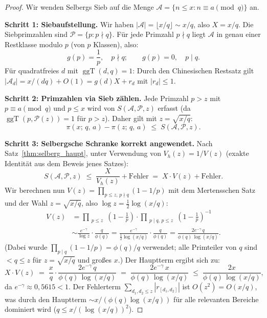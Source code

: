\documentclass[12pt,a4paper]{amsart}
\theoremstyle{definition}
\DeclareMathOperator{\ggT}{ggT}
\begin{document}
\begin{proof}
  Wir wenden Selbergs Sieb auf die Menge
  $\mathcal{A} = \{n \leq x : n \equiv a \pmod q\}$ an.

  \textbf{Schritt 1: Siebaufstellung.}
  Wir haben $|\mathcal{A}| = \lfloor x/q \rfloor \sim x/q$, also $X = x/q$.
  Die Siebprimzahlen sind $\mathcal{P} = \{p : p \nmid q\}$.
  Für jede Primzahl $p \nmid q$ liegt $\mathcal{A}$ in genau einer Restklasse
  modulo $p$ (von $p$ Klassen), also:
  \[
    g(p) = \frac{1}{p}, \quad p \nmid q; \qquad g(p) = 0, \quad p \mid q.
  \]
  Für quadratfreies $d$ mit $\ggT(d, q) = 1$: Durch den Chinesischen Restsatz
  gilt $|\mathcal{A}_d| = x/(dq) + O(1) = g(d) X + r_d$ mit $|r_d| \leq 1$.

  \textbf{Schritt 2: Primzahlen via Sieb zählen.}
  Jede Primzahl $p > z$ mit $p \equiv a \pmod q$ und $p \leq x$ wird von
  $S(\mathcal{A},\mathcal{P},z)$ erfasst (da $\ggT(p, \mathcal{P}(z)) = 1$
  für $p > z$).  Daher gilt mit $z = \sqrt{x/q}$:
  \[
    \pi(x;\,q,\,a) - \pi(z;\,q,\,a)
    \;\leq\; S(\mathcal{A},\mathcal{P},z).
  \]

  \textbf{Schritt 3: Selbergsche Schranke korrekt angewendet.}
  Nach Satz~\ref{thm:selberg_haupt}, unter Verwendung von $V_h(z) = 1/V(z)$
  (exakte Identität aus dem Beweis jenes Satzes):
  \[
    S(\mathcal{A},\mathcal{P},z)
    \;\leq\; \frac{X}{V_h(z)} + \text{Fehler}
    \;=\; X \cdot V(z) + \text{Fehler}.
  \]
  Wir berechnen nun $V(z) = \prod_{p \leq z,\, p \nmid q}(1 - 1/p)$ mit dem
  Mertensschen Satz und der Wahl $z = \sqrt{x/q}$, also $\log z = \tfrac{1}{2}\log(x/q)$:
  \begin{align*}
    V(z)
    &= \prod_{\substack{p \leq z}} \!\left(1 - \tfrac{1}{p}\right)
       \cdot \prod_{\substack{p \mid q,\, p \leq z}} \!\left(1 - \tfrac{1}{p}\right)^{-1} \\
    &\sim \frac{e^{-\gamma}}{\log z} \cdot \frac{q}{\phi(q)}
     = \frac{e^{-\gamma}}{\tfrac{1}{2}\log(x/q)} \cdot \frac{q}{\phi(q)}
     = \frac{2e^{-\gamma}\, q}{\phi(q)\,\log(x/q)}.
  \end{align*}
  (Dabei wurde $\prod_{p \mid q}(1-1/p) = \phi(q)/q$ verwendet; alle Primteiler
  von $q$ sind $< q \leq z$ für $z = \sqrt{x/q}$ und großes $x$.)
  Der Hauptterm ergibt sich zu:
  \[
    X \cdot V(z)
    \;=\; \frac{x}{q} \cdot \frac{2e^{-\gamma}\,q}{\phi(q)\,\log(x/q)}
    \;=\; \frac{2e^{-\gamma}\,x}{\phi(q)\,\log(x/q)}
    \;\leq\; \frac{2x}{\phi(q)\,\log(x/q)},
  \]
  da $e^{-\gamma} \approx 0{,}5615 < 1$.
  Der Fehlerterm $\sum_{d_1,d_2 \leq z} |r_{[d_1,d_2]}|$ ist $O(z^2) = O(x/q)$,
  was durch den Hauptterm $\sim x/(\phi(q)\log(x/q))$ für alle relevanten
  Bereiche dominiert wird ($q \leq x/(\log(x/q))^2$).


\end{proof}
\end{document}
